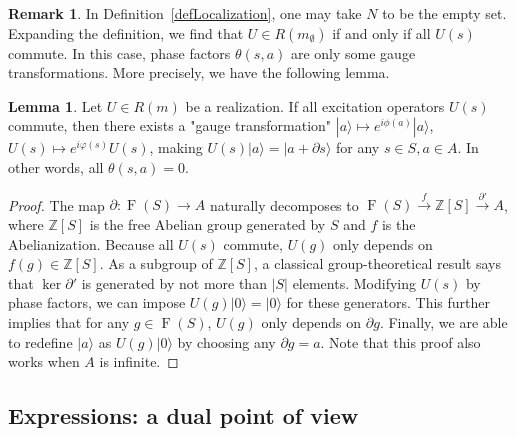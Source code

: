 \documentclass[reprint, amsmath, amssymb, showpacs, floatfix, longbibliography, aps, twocolumn, superscriptaddress, nofootinbib]{revtex4-2}
\newcommand{\ZZ}{{\mathbb Z}}
\theoremstyle{definition}
\newtheorem{lemma}{Lemma}[section]
\newtheorem{remark}{Remark}[section]
\begin{document}
\begin{remark}\label{remarkEmptySet}
	In Definition~\ref{defLocalization}, one may take $N$ to be the empty set.
	 Expanding the definition, we find that $U\in R(m_\emptyset)$ if and only if all $U(s)$ commute. In this case, phase factors $\theta(s,a)$ are only some gauge transformations. More precisely, we have the following lemma.
\end{remark}
\begin{lemma}\label{lemmaEmptySet}
	Let $U\in R(m)$ be a realization. If all excitation operators $U(s)$ commute, then there exists a "gauge transformation" $|a\rangle\mapsto e^{i\phi(a)}|a\rangle$, $U(s)\mapsto e^{i\varphi(s)}U(s)$, making $U(s)|a\rangle=|a+\partial s\rangle$ for any $s\in S,a\in A$. In other words, all $\theta(s,a)=0$.
\end{lemma}
\begin{proof}
	The map $\partial: \operatorname{F}(S)\rightarrow A$ naturally decomposes to $\operatorname{F}(S)\xrightarrow{f} \ZZ[S]\xrightarrow{\partial'}A$, where $\ZZ[S]$ is the free Abelian group generated by $S$ and $f$ is the Abelianization. Because all $U(s)$ commute, $U(g)$ only depends on $f(g)\in \ZZ[S]$. As a subgroup of $\ZZ[S]$, a classical group-theoretical result says that $\ker\partial'$ is generated by not more than $|S|$ elements. Modifying $U(s)$ by phase factors, we can impose $U(g)|0\rangle=|0\rangle$ for these generators. This further implies that for any $g\in \operatorname{F}(S)$, $U(g)$ only depends on $\partial g$. Finally, we are able to redefine $|a\rangle$ as $U(g)|0\rangle$ by choosing any $\partial g=a$. Note that this proof also works when $A$ is infinite.
\end{proof}


\subsection{Expressions: a dual point of view}\label{subsecExpression}
\end{document}
